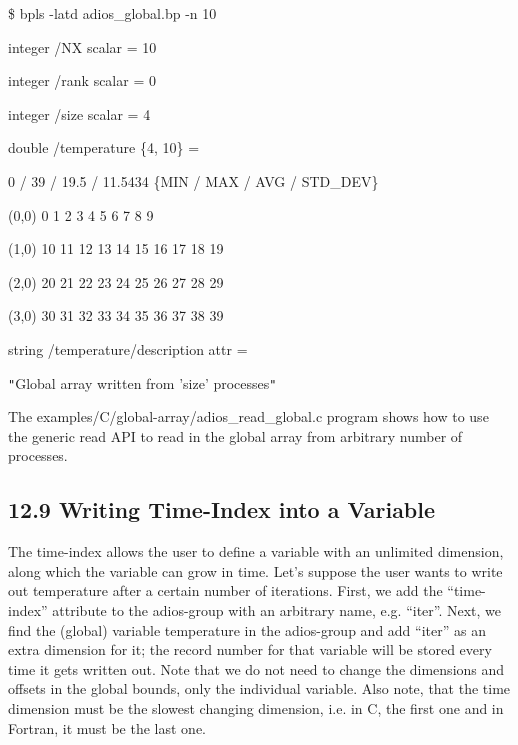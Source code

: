\vspace{22pt}
\$  bpls -latd adios\_global.bp -n 10

\vspace{22pt}
integer    /NX                       scalar = 10

\vspace{10pt}
\parindent=3pt
integer    /rank                     scalar = 0

\vspace{10pt}
integer    /size                     scalar = 4

\vspace{10pt}
\parindent=7pt
double     /temperature              \{4, 10\} = 

\vspace{10pt}
\parindent=0pt
0 / 39 / 19.5 / 11.5434  \{MIN / MAX / AVG / STD\_DEV\}

\vspace{10pt}
\parindent=14pt
(0,0)    0 1 2 3 4 5 6 7 8 9

\vspace{10pt}
(1,0)    10 11 12 13 14 15 16 17 18 19

\vspace{10pt}
\parindent=28pt
(2,0)    20 21 22 23 24 25 26 27 28 29

\vspace{10pt}
\parindent=14pt
(3,0)    30 31 32 33 34 35 36 37 38 39

\vspace{22pt}
\parindent=7pt
string     /temperature/description  attr   = 

\vspace{10pt}
\parindent=0pt
\texttt{"}Global array written from 'size' processes\texttt{"}

\vspace{10pt}
The examples/C/global-array/adios\_read\_global.c program shows how to use the 
generic read API to read in the global array from arbitrary number of processes. 
\label{HToc84890303}\label{HToc212016678}\label{HToc212016920}\label{HToc182553450}

\vspace{10pt}
\subsection*{{\large 12.9 }{\large \textbf{Writing Time-Index into a Variable}}}

\vspace{10pt}
The time-index allows the user to define a variable with an unlimited dimension, 
along which the variable can grow in time. Let's suppose the user wants to write 
out temperature after a certain number of iterations. First, we add the ``time-index'' 
attribute to the adios-group with an arbitrary name, e.g. ``iter''. Next, we find 
the (global) variable temperature in the adios-group and add ``iter'' as an extra 
dimension for it; the record number for that variable will be stored every time 
it gets written out. Note that we do not need to change the dimensions and offsets 
in the global bounds, only the individual variable. Also note, that the time dimension 
must be the slowest changing dimension, i.e. in C, the first one and in Fortran, 
it must be the last one.


